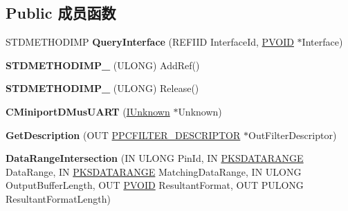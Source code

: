 \subsection*{Public 成员函数}
\begin{DoxyCompactItemize}
\item 
\mbox{\label{class_c_miniport_d_mus_u_a_r_t_afef57efcb66d0fa83d994f0c98f201f3}} 
S\+T\+D\+M\+E\+T\+H\+O\+D\+I\+MP {\bfseries Query\+Interface} (R\+E\+F\+I\+ID Interface\+Id, \hyperlink{interfacevoid}{P\+V\+O\+ID} $\ast$Interface)
\item 
\mbox{\label{class_c_miniport_d_mus_u_a_r_t_a95b3b846183f8c70ebd3ee1b9a81e8bb}} 
{\bfseries S\+T\+D\+M\+E\+T\+H\+O\+D\+I\+M\+P\+\_\+} (U\+L\+O\+NG) Add\+Ref()
\item 
\mbox{\label{class_c_miniport_d_mus_u_a_r_t_a0bf19ec83a2fde904975f6c347daf2a8}} 
{\bfseries S\+T\+D\+M\+E\+T\+H\+O\+D\+I\+M\+P\+\_\+} (U\+L\+O\+NG) Release()
\item 
\mbox{\label{class_c_miniport_d_mus_u_a_r_t_a697bf5502d1f7e7920461c73755bb6f8}} 
{\bfseries C\+Miniport\+D\+Mus\+U\+A\+RT} (\hyperlink{interface_i_unknown}{I\+Unknown} $\ast$Unknown)
\item 
\mbox{\label{class_c_miniport_d_mus_u_a_r_t_a461ae8f65b3678376b57a5befb758299}} 
{\bfseries Get\+Description} (O\+UT \hyperlink{struct_p_c_f_i_l_t_e_r___d_e_s_c_r_i_p_t_o_r}{P\+P\+C\+F\+I\+L\+T\+E\+R\+\_\+\+D\+E\+S\+C\+R\+I\+P\+T\+OR} $\ast$Out\+Filter\+Descriptor)
\item 
\mbox{\label{class_c_miniport_d_mus_u_a_r_t_a3df4e54ed5a8fd51dca54b162ad53eb3}} 
{\bfseries Data\+Range\+Intersection} (IN U\+L\+O\+NG Pin\+Id, IN \hyperlink{struct_k_s_d_a_t_a_f_o_r_m_a_t}{P\+K\+S\+D\+A\+T\+A\+R\+A\+N\+GE} Data\+Range, IN \hyperlink{struct_k_s_d_a_t_a_f_o_r_m_a_t}{P\+K\+S\+D\+A\+T\+A\+R\+A\+N\+GE} Matching\+Data\+Range, IN U\+L\+O\+NG Output\+Buffer\+Length, O\+UT \hyperlink{interfacevoid}{P\+V\+O\+ID} Resultant\+Format, O\+UT P\+U\+L\+O\+NG Resultant\+Format\+Length)
\item 
\mbox{\label{class_c_miniport_d_mus_u_a_r_t_aa99fc51e7e4543c3947e7f7a83852a2d}} 

\end{DoxyCompactItemize}
